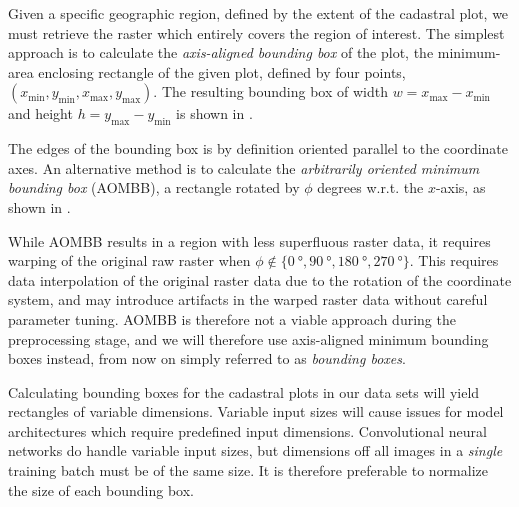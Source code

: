 Given a specific geographic region, defined by the extent of the cadastral plot, we must retrieve the raster which entirely covers the region of interest.
The simplest approach is to calculate the \textit{axis-aligned bounding box} of the plot, the minimum-area enclosing rectangle of the given plot, defined by four points, $(x_{\mathrm{min}}, y_{\mathrm{min}}, x_{\mathrm{max}}, y_{\mathrm{max}})$.
The resulting bounding box of width $w = x_{\mathrm{max}} - x_{\mathrm{min}}$ and height $h = y_{\mathrm{max}} - y_{\mathrm{min}}$ is shown in .

\begin{figure}[htb]
  \captionsetup[subfigure]{position=b}
  \centering
  \hspace{2em}
\end{figure}

The edges of the bounding box is by definition oriented parallel to the coordinate axes.
An alternative method is to calculate the \textit{arbitrarily oriented minimum bounding box} (AOMBB), a rectangle rotated by $\phi$ degrees w.r.t. the $x$-axis, as shown in .

While AOMBB results in a region with less superfluous raster data, it requires warping of the original raw raster when $\phi \not\in \{ \SI{0}{\degree}, \SI{90}{\degree}, \SI{180}{\degree}, \SI{270}{\degree} \}$.
This requires data interpolation of the original raster data due to the rotation of the coordinate system, and may introduce artifacts in the warped raster data without careful parameter tuning.
AOMBB is therefore not a viable approach during the preprocessing stage, and we will therefore use axis-aligned minimum bounding boxes instead, from now on simply referred to as \textit{bounding boxes}.

Calculating bounding boxes for the cadastral plots in our data sets will yield rectangles of variable dimensions.
Variable input sizes will cause issues for model architectures which require predefined input dimensions.
Convolutional neural networks do handle variable input sizes, but dimensions off all images in a \textit{single} training batch must be of the same size.
It is therefore preferable to normalize the size of each bounding box.

